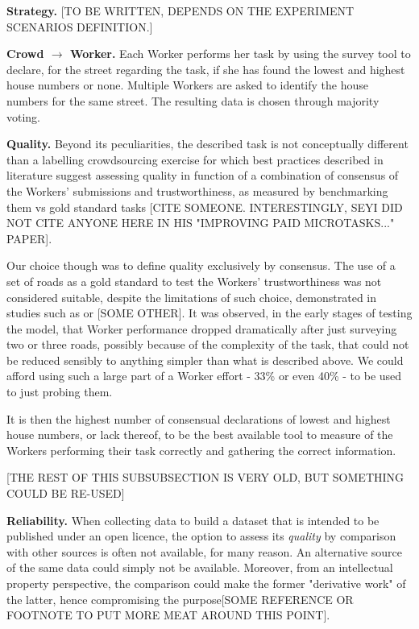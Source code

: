         \textbf{Strategy.} 
        {[}TO BE WRITTEN, DEPENDS ON THE EXPERIMENT SCENARIOS DEFINITION.{]}
        
        \textbf{Crowd $\rightarrow$ Worker.} Each Worker performs her task by using the survey tool to declare, for the street regarding the task, if she has found the lowest and highest house numbers or none. Multiple Workers are asked to identify the house numbers for the same street. The resulting data is chosen through majority voting.
    
        \textbf{Quality.} Beyond its peculiarities, the described task is not conceptually different than a labelling crowdsourcing exercise for which best practices described in literature suggest assessing quality in function of a combination of consensus of the Workers' submissions and trustworthiness, as measured by benchmarking them vs gold standard tasks [CITE SOMEONE. INTERESTINGLY, SEYI DID NOT CITE ANYONE HERE IN HIS "IMPROVING PAID MICROTASKS..." PAPER].
        
        Our choice though was to define quality exclusively by consensus. The use of a set of roads as a gold standard to test the Workers' trustworthiness was not considered suitable, despite the limitations of such choice, demonstrated in studies such as \cite{DellaPenna:tf} or [SOME OTHER]. It was observed, in the early stages of testing the model, that Worker performance dropped dramatically after just surveying two or three roads, possibly because of the complexity of the task, that could not be reduced sensibly to anything simpler than what is described above. We could afford using such a large part of a Worker effort - 33\% or even 40\% - to be used to just probing them.
        
        It is then the highest number of consensual declarations of lowest and highest house numbers, or lack thereof, to be the best available tool to measure of the Workers performing their task correctly and gathering the correct information.  

        [THE REST OF THIS SUBSUBSECTION IS VERY OLD, BUT SOMETHING COULD BE RE-USED]

        \textbf{Reliability.} When collecting data to build a dataset that is intended to be published under an open licence, the option to assess its \textit{quality} by comparison with other sources is often not available, for many reason. An alternative source of the same data could simply not be available. Moreover, from an intellectual property perspective, the comparison could make the former "derivative work" of the latter, hence compromising the purpose{[}SOME REFERENCE OR FOOTNOTE TO PUT MORE MEAT AROUND THIS POINT{]}. 
        
